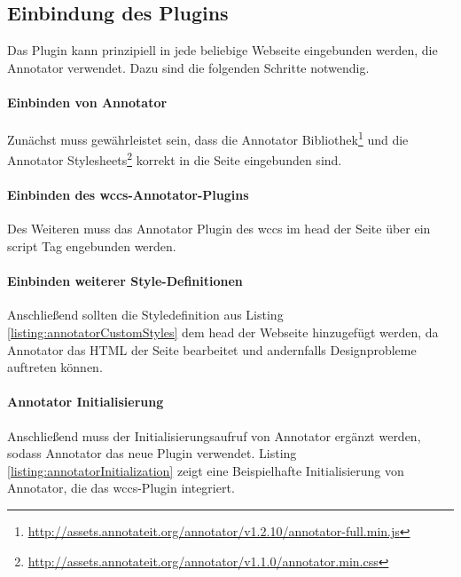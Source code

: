\subsection{Einbindung des Plugins}
    Das Plugin kann prinzipiell in jede beliebige Webseite eingebunden werden,
    die Annotator verwendet.
    Dazu sind die folgenden Schritte notwendig.

    \paragraph{Einbinden von Annotator}
    Zunächst muss gewährleistet sein, dass die
    Annotator Bibliothek\footnote{\url{http://assets.annotateit.org/annotator/v1.2.10/annotator-full.min.js}}
    und die Annotator Stylesheets\footnote{\url{http://assets.annotateit.org/annotator/v1.1.0/annotator.min.css}}
    korrekt in die Seite eingebunden sind.

    \paragraph{Einbinden des \gls{wccs}-Annotator-Plugins}
    Des Weiteren muss das Annotator Plugin des \gls{wccs} im head der Seite über ein
    script Tag engebunden werden.

    \paragraph{Einbinden weiterer Style-Definitionen}
    Anschließend sollten die Styledefinition aus Listing \ref{listing:annotatorCustomStyles}
    dem head der Webseite hinzugefügt werden,
    da Annotator das HTML der Seite bearbeitet und andernfalls Designprobleme auftreten können.

    

    \paragraph{Annotator Initialisierung}
    Anschließend muss der Initialisierungsaufruf von Annotator ergänzt werden,
    sodass Annotator das neue Plugin verwendet.
    Listing \ref{listing:annotatorInitialization} zeigt eine Beispielhafte
    Initialisierung von Annotator, die das \gls{wccs}-Plugin integriert.

    

